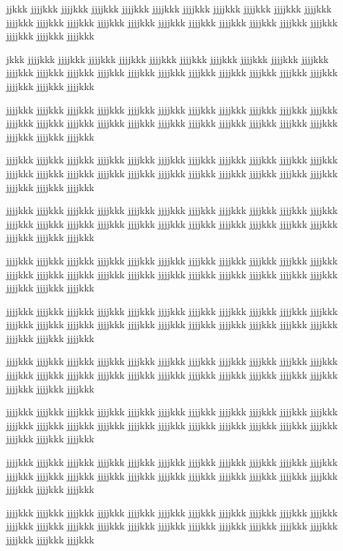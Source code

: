 jjkkk jjjjkkk jjjjkkk jjjjkkk jjjjkkk jjjjkkk jjjjkkk jjjjkkk jjjjkkk jjjjkkk jjjjkkk jjjjkkk jjjjkkk jjjjkkk jjjjkkk jjjjkkk jjjjkkk jjjjkkk jjjjkkk jjjjkkk jjjjkkk jjjjkkk jjjjkkk jjjjkkk jjjjkkk

jkkk jjjjkkk jjjjkkk jjjjkkk jjjjkkk jjjjkkk jjjjkkk jjjjkkk jjjjkkk jjjjkkk jjjjkkk jjjjkkk jjjjkkk jjjjkkk jjjjkkk jjjjkkk jjjjkkk jjjjkkk jjjjkkk jjjjkkk jjjjkkk jjjjkkk jjjjkkk jjjjkkk jjjjkkk

jjjjkkk jjjjkkk jjjjkkk jjjjkkk jjjjkkk jjjjkkk jjjjkkk jjjjkkk jjjjkkk jjjjkkk jjjjkkk jjjjkkk jjjjkkk jjjjkkk jjjjkkk jjjjkkk jjjjkkk jjjjkkk jjjjkkk jjjjkkk jjjjkkk jjjjkkk jjjjkkk jjjjkkk jjjjkkk

jjjjkkk jjjjkkk jjjjkkk jjjjkkk jjjjkkk jjjjkkk jjjjkkk jjjjkkk jjjjkkk jjjjkkk jjjjkkk jjjjkkk jjjjkkk jjjjkkk jjjjkkk jjjjkkk jjjjkkk jjjjkkk jjjjkkk jjjjkkk jjjjkkk jjjjkkk jjjjkkk jjjjkkk jjjjkkk

jjjjkkk jjjjkkk jjjjkkk jjjjkkk jjjjkkk jjjjkkk jjjjkkk jjjjkkk jjjjkkk jjjjkkk jjjjkkk jjjjkkk jjjjkkk jjjjkkk jjjjkkk jjjjkkk jjjjkkk jjjjkkk jjjjkkk jjjjkkk jjjjkkk jjjjkkk jjjjkkk jjjjkkk jjjjkkk

jjjjkkk jjjjkkk jjjjkkk jjjjkkk jjjjkkk jjjjkkk jjjjkkk jjjjkkk jjjjkkk jjjjkkk jjjjkkk jjjjkkk jjjjkkk jjjjkkk jjjjkkk jjjjkkk jjjjkkk jjjjkkk jjjjkkk jjjjkkk jjjjkkk jjjjkkk jjjjkkk jjjjkkk jjjjkkk

jjjjkkk jjjjkkk jjjjkkk jjjjkkk jjjjkkk jjjjkkk jjjjkkk jjjjkkk jjjjkkk jjjjkkk jjjjkkk jjjjkkk jjjjkkk jjjjkkk jjjjkkk jjjjkkk jjjjkkk jjjjkkk jjjjkkk jjjjkkk jjjjkkk jjjjkkk jjjjkkk jjjjkkk jjjjkkk

jjjjkkk jjjjkkk jjjjkkk jjjjkkk jjjjkkk jjjjkkk jjjjkkk jjjjkkk jjjjkkk jjjjkkk jjjjkkk jjjjkkk jjjjkkk jjjjkkk jjjjkkk jjjjkkk jjjjkkk jjjjkkk jjjjkkk jjjjkkk jjjjkkk jjjjkkk jjjjkkk jjjjkkk jjjjkkk

jjjjkkk jjjjkkk jjjjkkk jjjjkkk jjjjkkk jjjjkkk jjjjkkk jjjjkkk jjjjkkk jjjjkkk jjjjkkk jjjjkkk jjjjkkk jjjjkkk jjjjkkk jjjjkkk jjjjkkk jjjjkkk jjjjkkk jjjjkkk jjjjkkk jjjjkkk jjjjkkk jjjjkkk jjjjkkk

jjjjkkk jjjjkkk jjjjkkk jjjjkkk jjjjkkk jjjjkkk jjjjkkk jjjjkkk jjjjkkk jjjjkkk jjjjkkk jjjjkkk jjjjkkk jjjjkkk jjjjkkk jjjjkkk jjjjkkk jjjjkkk jjjjkkk jjjjkkk jjjjkkk jjjjkkk jjjjkkk jjjjkkk jjjjkkk

jjjjkkk jjjjkkk jjjjkkk jjjjkkk jjjjkkk jjjjkkk jjjjkkk jjjjkkk jjjjkkk jjjjkkk jjjjkkk jjjjkkk jjjjkkk jjjjkkk jjjjkkk jjjjkkk jjjjkkk jjjjkkk jjjjkkk jjjjkkk jjjjkkk jjjjkkk jjjjkkk jjjjkkk jjjjkkk

